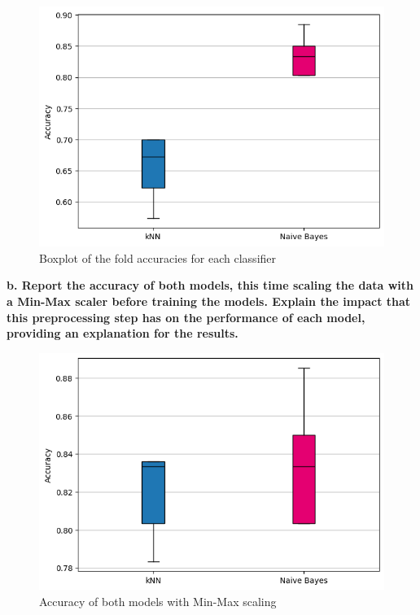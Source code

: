 \documentclass[12pt]{article}
\begin{document}
    \begin{figure}[H]
        \centering
          \includegraphics[width=12cm]{./Part II/1_a.png}
          \caption{Boxplot of the fold accuracies for each classifier}
    \end{figure}

\vspace{20pt}


\textbf{b. Report the accuracy of both models, this time scaling the data with a
Min-Max scaler before training the models. Explain the impact that this
preprocessing step has on the performance of each model, providing an
explanation for the results.}

\vspace{20pt}


\begin{figure}[H]
    \centering
      \includegraphics[width=12cm]{./Part II/1_b.png}
      \caption{Accuracy of both models with Min-Max scaling}
\end{figure}
\end{document}

